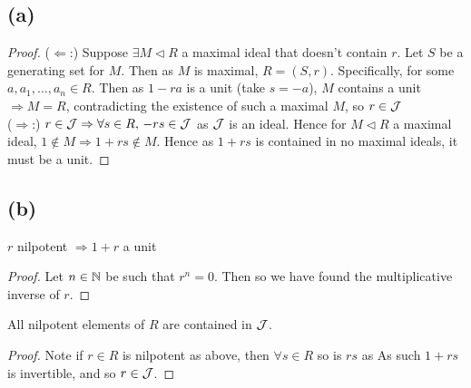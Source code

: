 \documentclass{article}
\begin{document}
\subsection{(a)}
\begin{prop}
\end{prop}
\begin{proof}
($\Leftarrow$:) Suppose $\exists M \vartriangleleft R$ a maximal ideal that doesn't contain $r$. Let $S$ be a generating set for $M$. Then as $M$ is maximal, $R = (S,r)$. Specifically, 
for some $a,a_1, \dots,a_n \in R$. Then as $1-ra$ is a unit (take $s=-a$), $M$ contains a unit $\Rightarrow M=R$, contradicting the existence of such a maximal $M$, so $r \in \mathcal{J}$ \\
($\Rightarrow$:) $r \in \mathcal{J} \Rightarrow \forall s \in R, \, -rs \in \mathcal{J}$ as $\mathcal{J}$ is an ideal. Hence for $M \vartriangleleft R$ a maximal ideal, $1 \notin M \Rightarrow 1+rs \notin M$. Hence as $1+rs$ is contained in no maximal ideals, it must be a unit. 
\end{proof}

\subsection{(b)}

\begin{prop}
$r$ nilpotent $\Rightarrow 1+r$ a unit 
\end{prop}
\begin{proof}
Let $n \in \mathbb{N}$ be such that $r^n = 0$. Then 
so we have found the multiplicative inverse of $r$. 
\end{proof}

\begin{corollary}
All nilpotent elements of $R$ are contained in $\mathcal{J}$.
\end{corollary}
\begin{proof}
Note if $r\in R$ is nilpotent as above, then $\forall s \in R$ so is $rs$ as 
As such $1+rs$ is invertible, and so $r \in \mathcal{J}$. 
\end{proof}


\end{document}
